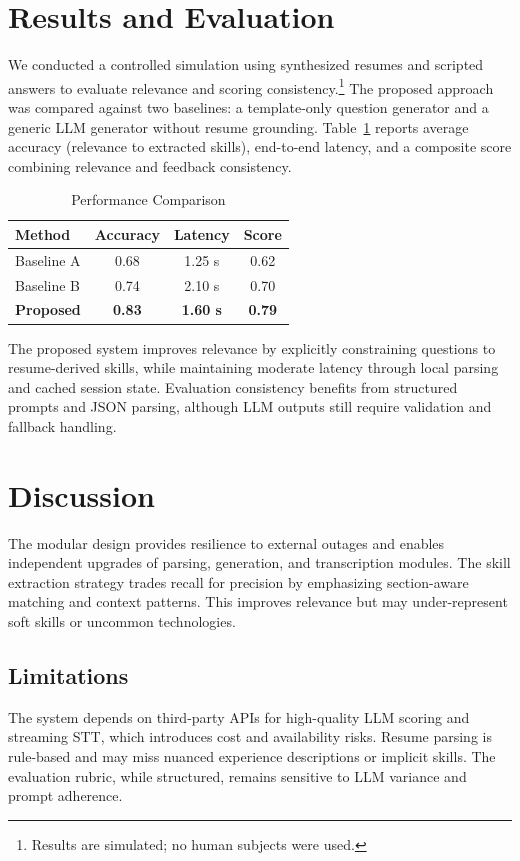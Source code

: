 \documentclass[conference]{IEEEtran}
\begin{document}
\section{Results and Evaluation}
We conducted a controlled simulation using synthesized resumes and scripted answers to evaluate relevance and scoring consistency.\footnote{Results are simulated; no human subjects were used.} The proposed approach was compared against two baselines: a template-only question generator and a generic LLM generator without resume grounding. Table~\ref{tab:comparison} reports average accuracy (relevance to extracted skills), end-to-end latency, and a composite score combining relevance and feedback consistency.

\begin{table}[htbp]
\caption{Performance Comparison}
\label{tab:comparison}
\centering
\begin{tabular}{lccc}
\toprule
\textbf{Method} & \textbf{Accuracy} & \textbf{Latency} & \textbf{Score} \\
\midrule
Baseline A & 0.68 & 1.25 s & 0.62 \\
Baseline B & 0.74 & 2.10 s & 0.70 \\
\textbf{Proposed} & \textbf{0.83} & \textbf{1.60 s} & \textbf{0.79} \\
\bottomrule
\end{tabular}
\end{table}

The proposed system improves relevance by explicitly constraining questions to resume-derived skills, while maintaining moderate latency through local parsing and cached session state. Evaluation consistency benefits from structured prompts and JSON parsing, although LLM outputs still require validation and fallback handling.

\section{Discussion}
The modular design provides resilience to external outages and enables independent upgrades of parsing, generation, and transcription modules. The skill extraction strategy trades recall for precision by emphasizing section-aware matching and context patterns. This improves relevance but may under-represent soft skills or uncommon technologies.

\subsection{Limitations}
The system depends on third-party APIs for high-quality LLM scoring and streaming STT, which introduces cost and availability risks. Resume parsing is rule-based and may miss nuanced experience descriptions or implicit skills. The evaluation rubric, while structured, remains sensitive to LLM variance and prompt adherence.
\end{document}
